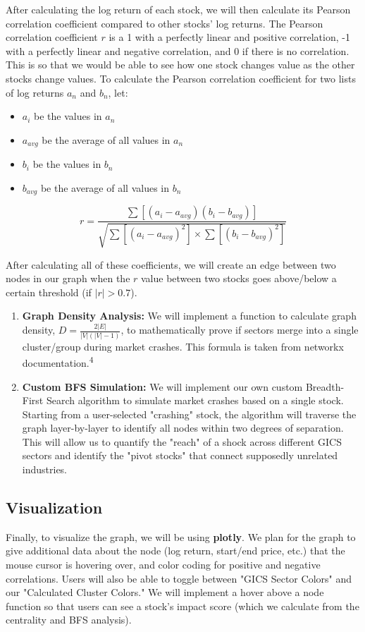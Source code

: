 \documentclass[fontsize=11pt]{article}
\begin{document}
After calculating the log return of each stock, we will then calculate its Pearson correlation coefficient compared to other stocks' log returns. The Pearson correlation coefficient $r$ is a 1 with a perfectly linear and positive correlation, -1 with a perfectly linear and negative correlation, and 0 if there is no correlation. This is so that we would be able to see how one stock changes value as the other stocks change values. To calculate the Pearson correlation coefficient for two lists of log returns $a_n$ and $b_n$, let:
\begin{itemize}
    \item $a_i$ be the values in $a_n$
    \item $a_{avg}$ be the average of all values in $a_n$
    \item $b_i$ be the values in $b_n$
    \item $b_{avg}$ be the average of all values in $b_n$
\end{itemize}
\[ r = \frac{\sum[(a_i - a_{avg})(b_i - b_{avg})]}{\sqrt{\sum[(a_i - a_{avg})^2] \times \sum[(b_i - b_{avg})^2]}} \]

After calculating all of these coefficients, we will create an edge between two nodes in our graph when the $r$ value between two stocks goes above/below a certain threshold (if $|r| > 0.7$).

\begin{enumerate}
    \item \textbf{Graph Density Analysis:} We will implement a function to calculate graph density, $D = \frac{2|E|}{|V|(|V|-1)}$, to mathematically prove if sectors merge into a single cluster/group during market crashes. This formula is taken from networkx documentation.\textsuperscript{4}
    \item \textbf{Custom BFS Simulation:} We will implement our own custom Breadth-First Search algorithm to simulate market crashes based on a single stock. Starting from a user-selected "crashing" stock, the algorithm will traverse the graph layer-by-layer to identify all nodes within two degrees of separation. This will allow us to quantify the "reach" of a shock across different GICS sectors and identify the "pivot stocks" that connect supposedly unrelated industries.
\end{enumerate}

\subsection*{Visualization}
Finally, to visualize the graph, we will be using \textbf{plotly}. We plan for the graph to give additional data about the node (log return, start/end price, etc.) that the mouse cursor is hovering over, and color coding for positive and negative correlations. Users will also be able to toggle between "GICS Sector Colors" and our "Calculated Cluster Colors." We will implement a hover above a node function so that users can see a stock's impact score (which we calculate from the centrality and BFS analysis).
\end{document}

